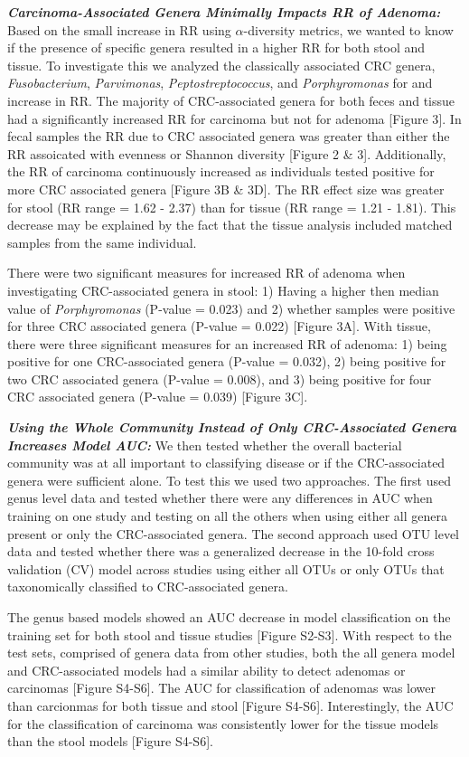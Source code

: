 \documentclass[12pt,]{article}
\begin{document}
\textbf{\emph{Carcinoma-Associated Genera Minimally Impacts RR of
Adenoma:}} Based on the small increase in RR using \(\alpha\)-diversity
metrics, we wanted to know if the presence of specific genera resulted
in a higher RR for both stool and tissue. To investigate this we
analyzed the classically associated CRC genera, \emph{Fusobacterium},
\emph{Parvimonas}, \emph{Peptostreptococcus}, and \emph{Porphyromonas}
for and increase in RR. The majority of CRC-associated genera for both
feces and tissue had a significantly increased RR for carcinoma but not
for adenoma {[}Figure 3{]}. In fecal samples the RR due to CRC
associated genera was greater than either the RR assoicated with
evenness or Shannon diversity {[}Figure 2 \& 3{]}. Additionally, the RR
of carcinoma continuously increased as individuals tested positive for
more CRC associated genera {[}Figure 3B \& 3D{]}. The RR effect size was
greater for stool (RR range = 1.62 - 2.37) than for tissue (RR range =
1.21 - 1.81). This decrease may be explained by the fact that the tissue
analysis included matched samples from the same individual.

There were two significant measures for increased RR of adenoma when
investigating CRC-associated genera in stool: 1) Having a higher then
median value of \emph{Porphyromonas} (P-value = 0.023) and 2) whether
samples were positive for three CRC associated genera (P-value = 0.022)
{[}Figure 3A{]}. With tissue, there were three significant measures for
an increased RR of adenoma: 1) being positive for one CRC-associated
genera (P-value = 0.032), 2) being positive for two CRC associated
genera (P-value = 0.008), and 3) being positive for four CRC associated
genera (P-value = 0.039) {[}Figure 3C{]}.

\textbf{\emph{Using the Whole Community Instead of Only CRC-Associated
Genera Increases Model AUC:}} We then tested whether the overall
bacterial community was at all important to classifying disease or if
the CRC-associated genera were sufficient alone. To test this we used
two approaches. The first used genus level data and tested whether there
were any differences in AUC when training on one study and testing on
all the others when using either all genera present or only the
CRC-associated genera. The second approach used OTU level data and
tested whether there was a generalized decrease in the 10-fold cross
validation (CV) model across studies using either all OTUs or only OTUs
that taxonomically classified to CRC-associated genera.

The genus based models showed an AUC decrease in model classification on
the training set for both stool and tissue studies {[}Figure S2-S3{]}.
With respect to the test sets, comprised of genera data from other
studies, both the all genera model and CRC-associated models had a
similar ability to detect adenomas or carcinomas {[}Figure S4-S6{]}. The
AUC for classification of adenomas was lower than carcionmas for both
tissue and stool {[}Figure S4-S6{]}. Interestingly, the AUC for the
classification of carcinoma was consistently lower for the tissue models
than the stool models {[}Figure S4-S6{]}.
\end{document}
